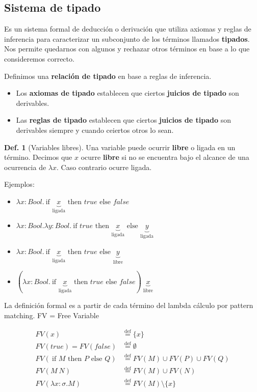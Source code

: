 \documentclass{report}
\theoremstyle{definition} %
\newtheorem{definition}{Def.}[chapter]
\newcommand{\eqdef}{\overset{\text{def}}{=}}
\newcommand{\ifte}[3]{\ \text{if } #1 \text{ then } #2 \text{ else } #3}
\newcommand{\abs}[3]{\lambda #1 : #2 . #3}
\newcommand{\app}[2]{#1 \ #2} %
\newcommand{\fv}[1]{FV(#1)}
\newcommand{\ligada}[1]{\underbrace{#1}_{\text{ligada}}}
\newcommand{\libre}[1]{\underbrace{#1}_{\text{libre}}}
\begin{document}
\subsection{Sistema de tipado}

Es un sistema formal de deducción o derivación que utiliza axiomas y reglas de
inferencia para caracterizar un subconjunto de los términos llamados
\textbf{tipados}. Nos permite quedarnos con algunos y rechazar otros términos en
base a lo que consideremos correcto.

Definimos una \textbf{relación de tipado} en base a reglas de inferencia.
\begin{itemize}
    \item Los \textbf{axiomas de tipado} establecen que ciertos \textbf{juicios
    de tipado} son derivables.
    \item Las \textbf{reglas de tipado} establecen que ciertos \textbf{juicios
    de tipado} son derivables siempre y cuando ceiertos otros lo sean.  
\end{itemize}

\begin{definition}[Variables libres]
Una variable puede ocurrir \textbf{libre} o ligada en un término. Decimos que
$x$ ocurre \textbf{libre} si no se encuentra bajo el alcance de una ocurrencia
de $\lambda x$. Caso contrario ocurre ligada.

Ejemplos:

\begin{itemize}
    \item $\abs
        {x}{Bool}
        {\ifte{\ligada{x}}{true}{false}}$
    \item $\abs
        {x}
        {Bool}
        {\abs{y}{Bool}{\ifte{true}{\ligada{x}}{\ligada{y}}}}$
    \item $\abs{x}{Bool}{\ifte{\ligada{x}}{true}{\libre{y}}}$
    \item $\app{(\abs{x}{Bool}{\ifte{\ligada{x}}{true}{false}})}{\libre{x}}$
\end{itemize}

La definición formal es a partir de cada término del lambda cálculo por pattern
matching. FV = Free Variable

\begin{align*}
    \fv{x} &\eqdef \{ x \} \\
    \fv{true} = \fv{false} &\eqdef \emptyset \\
    \fv{\ifte{M}{P}{Q}} &\eqdef \fv{M} \cup \fv{P} \cup \fv{Q} \\
    \fv{\app{M}{N}} &\eqdef \fv{M} \cup \fv{N} \\
    \fv{\abs{x}{\sigma}{M}} &\eqdef \fv{M} \setminus \{ x \}
\end{align*}
\end{definition}
\end{document}
